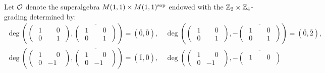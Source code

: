 \begin{ex}\label{ex:superalgebra-O}
    Let $\mathcal O$ denote the superalgebra $M(1,1) \times M(1,1)^{\mathrm{sop}}$ endowed with the $\mathbb{Z}_2\times \mathbb{Z}_4$-grading determined by:
    \begin{align*}
        \deg \left(\begin{pmatrix}
            \phantom{.}1 & \phantom{-}0\phantom{.}\\
            \phantom{.}0 & \phantom{-}1\phantom{.}
        \end{pmatrix}, \overline{\begin{pmatrix}
            \phantom{.}1 & \phantom{-}0\phantom{.}\\
            \phantom{.}0 & \phantom{-}1\phantom{.}
        \end{pmatrix}}\right) = (\bar 0, \bar 0),\,&
        \deg \left(\begin{pmatrix}
            \phantom{.}1 & \phantom{-}0\phantom{.}\\
            \phantom{.}0 & \phantom{-}1\phantom{.}
        \end{pmatrix}, -\overline{\begin{pmatrix}
            \phantom{.}1 & \phantom{-}0\phantom{.}\\
            \phantom{.}0 & \phantom{-}1\phantom{.}
        \end{pmatrix}}\right) = (\bar 0, \bar 2),\\
        \deg \left(\begin{pmatrix}
            \phantom{.}1 & \phantom{-}0\phantom{.}\\
            \phantom{.}0 & -1\phantom{.}
        \end{pmatrix}, \overline{\begin{pmatrix}
            \phantom{.}1 & \phantom{-}0\phantom{.}\\
            \phantom{.}0 & -1\phantom{.}
        \end{pmatrix}}\right) = (\bar 1, \bar 0),\,&
        \deg \left(\begin{pmatrix}
            \phantom{.}1 & \phantom{-}0\phantom{.}\\
            \phantom{.}0 & -1\phantom{.}
        \end{pmatrix}, -\overline{\begin{pmatrix}
            \phantom{.}1 & \phantom{-}0\phantom{.}\\

\end{pmatrix}}
\end{align*}
\end{ex}
